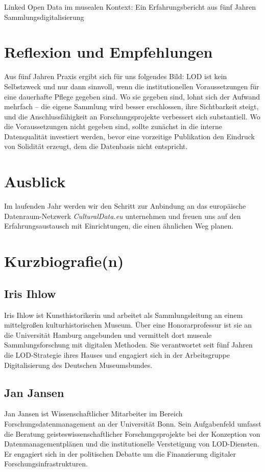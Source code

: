 \begin{beitrag}{Linked Open Data im musealen Kontext: Ein Erfahrungsbericht aus fünf Jahren Sammlungsdigitalisierung}
\section{Reflexion und Empfehlungen}
Aus fünf Jahren Praxis ergibt sich für uns folgendes Bild: LOD ist kein Selbstzweck und nur dann sinnvoll, wenn die institutionellen Voraussetzungen für eine dauerhafte Pflege gegeben sind. Wo sie gegeben sind, lohnt sich der Aufwand mehrfach -- die eigene Sammlung wird besser erschlossen, ihre Sichtbarkeit steigt, und die Anschlussfähigkeit an Forschungsprojekte verbessert sich substantiell. Wo die Voraussetzungen nicht gegeben sind, sollte zunächst in die interne Datenqualität investiert werden, bevor eine vorzeitige Publikation den Eindruck von Solidität erzeugt, dem die Datenbasis nicht entspricht.

\section{Ausblick}
Im laufenden Jahr werden wir den Schritt zur Anbindung an das europäische Datenraum-Netzwerk \emph{CulturalData.eu} unternehmen und freuen uns auf den Erfahrungsaustausch mit Einrichtungen, die einen ähnlichen Weg planen.

\end{beitrag}

\section*{Kurzbiografie(n)}

\subsection*{Iris Ihlow}
Iris Ihlow ist Kunsthistorikerin und arbeitet als Sammlungsleitung an einem mittelgroßen kulturhistorischen Museum. Über eine Honorarprofessur ist sie an die Universität Hamburg angebunden und vermittelt dort museale Sammlungsforschung mit digitalen Methoden. Sie verantwortet seit fünf Jahren die LOD-Strategie ihres Hauses und engagiert sich in der Arbeitsgruppe Digitalisierung des Deutschen Museumsbundes.

\subsection*{Jan Jansen}
Jan Jansen ist Wissenschaftlicher Mitarbeiter im Bereich Forschungsdatenmanagement an der Universität Bonn. Sein Aufgabenfeld umfasst die Beratung geisteswissenschaftlicher Forschungsprojekte bei der Konzeption von Datenmanagementplänen und die institutionelle Verstetigung von LOD-Diensten. Er engagiert sich in der politischen Debatte um die Finanzierung digitaler Forschungsinfrastrukturen.
